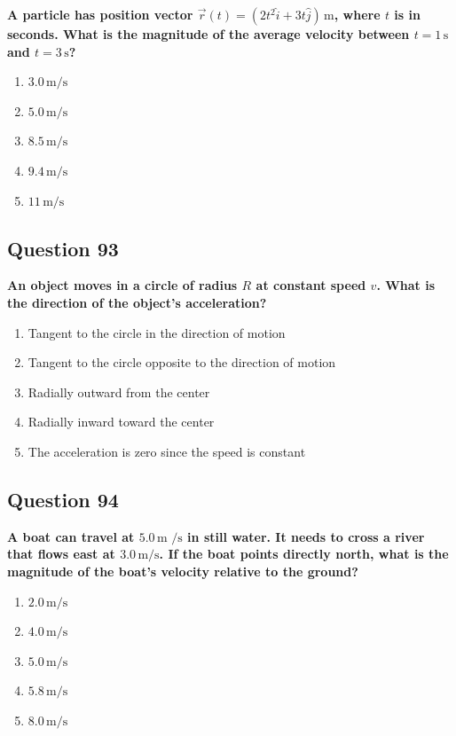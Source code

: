 \documentclass[12pt,letterpaper]{article}
\begin{document}
\begin{questionbox}
\textbf{A particle has position vector $\vec{r}(t) = (2t^2\hat{i} + 3t\hat{j})\,\text{m}$, where $t$ is in seconds. What is the magnitude of the average velocity between $t = 1\,\text{s}$ and $t = 3\,\text{s}$?}

\begin{enumerate}[label=\alph*)]
    \item $3.0\,\text{m/s}$
    \item $5.0\,\text{m/s}$
    \item $8.5\,\text{m/s}$
    \item $9.4\,\text{m/s}$
    \item $11\,\text{m/s}$
\end{enumerate}
\end{questionbox}

\subsection{Question 93}

\begin{questionbox}
\textbf{An object moves in a circle of radius $R$ at constant speed $v$. What is the direction of the object's acceleration?}

\begin{enumerate}[label=\alph*)]
    \item Tangent to the circle in the direction of motion
    \item Tangent to the circle opposite to the direction of motion
    \item Radially outward from the center
    \item Radially inward toward the center
    \item The acceleration is zero since the speed is constant
\end{enumerate}
\end{questionbox}

\subsection{Question 94}

\begin{questionbox}
\textbf{A boat can travel at $5.0\,\text{m
/s}$ in still water. It needs to cross a river that flows east at $3.0\,\text{m/s}$. If the boat points directly north, what is the magnitude of the boat's velocity relative to the ground?}

\begin{enumerate}[label=\alph*)]
    \item $2.0\,\text{m/s}$
    \item $4.0\,\text{m/s}$
    \item $5.0\,\text{m/s}$
    \item $5.8\,\text{m/s}$
    \item $8.0\,\text{m/s}$
\end{enumerate}
\end{questionbox}
\end{document}
